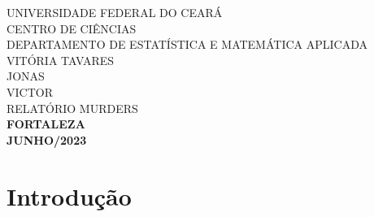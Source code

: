 \documentclass[12pt]{article}
\begin{document}
\thispagestyle{empty}

\begin{center}
UNIVERSIDADE FEDERAL DO CEARÁ \\
CENTRO DE CIÊNCIAS \\
DEPARTAMENTO DE ESTATÍSTICA E MATEMÁTICA APLICADA \\
\vspace{4cm}
VITÓRIA TAVARES \\
JONAS \\
VICTOR \\
\vspace{6cm}
RELATÓRIO MURDERS \\
\vspace{10cm}
\textbf{FORTALEZA \\
JUNHO/2023}
\end{center}

\newpage 
\tableofcontents

\newpage 
\section{Introdução}
\end{document}
